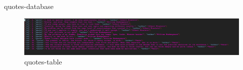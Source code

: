 \begin{frame}{quotes-database}
	\begin{figure}
		\centering
		\includegraphics[width =1\linewidth]{robot-spark-proj/quotes-table.PNG}
		\caption{quotes-table}
	\end{figure}
	
\end{frame}

